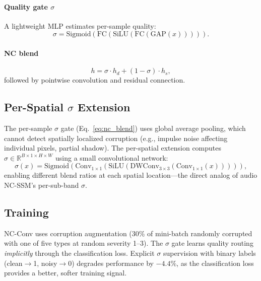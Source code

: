 \documentclass[journal]{IEEEtran}
\begin{document}
\paragraph{Quality gate $\sigma$}
A lightweight MLP estimates per-sample quality:
\begin{equation}
\sigma = \text{Sigmoid}(\text{FC}(\text{SiLU}(\text{FC}(\text{GAP}(x))))).
\end{equation}

\paragraph{NC blend}
\begin{equation}
h = \sigma \cdot h_d + (1-\sigma) \cdot h_s,
\label{eq:nc_blend}
\end{equation}
followed by pointwise convolution and residual connection.

\subsection{Per-Spatial $\sigma$ Extension}
\label{sec:perspatial}

The per-sample $\sigma$ gate (Eq.~\ref{eq:nc_blend}) uses global average pooling, which cannot detect spatially localized corruption (e.g., impulse noise affecting individual pixels, partial shadow).
The per-spatial extension computes $\sigma \in \mathbb{R}^{B \times 1 \times H \times W}$ using a small convolutional network:
\begin{equation}
\sigma(x) = \text{Sigmoid}(\text{Conv}_{1\times 1}(\text{SiLU}(\text{DWConv}_{3\times 3}(\text{Conv}_{1\times 1}(x))))),
\end{equation}
enabling different blend ratios at each spatial location---the direct analog of audio NC-SSM's per-sub-band $\sigma$.

\subsection{Training}

NC-Conv uses corruption augmentation (30\% of mini-batch randomly corrupted with one of five types at random severity 1--3).
The $\sigma$ gate learns quality routing \emph{implicitly} through the classification loss.
Explicit $\sigma$ supervision with binary labels (clean$\to$1, noisy$\to$0) degrades performance by $-4.4\%$, as the classification loss provides a better, softer training signal.


\end{document}
